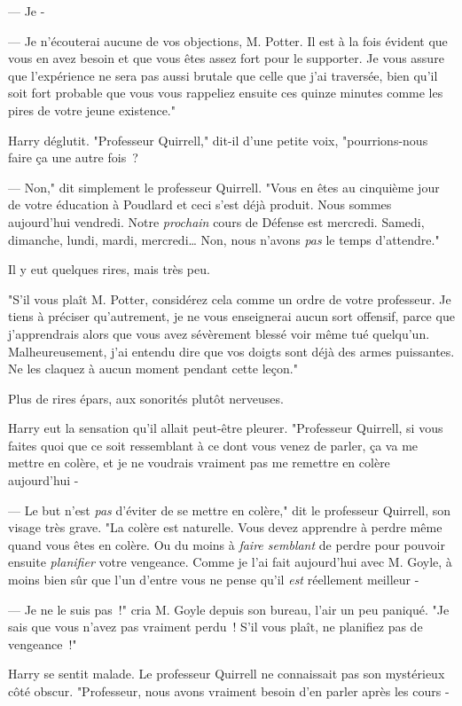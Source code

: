 --- Je -

--- Je n'écouterai aucune de vos objections, M. Potter. Il est à la fois évident que vous en avez besoin et que vous êtes assez fort pour le supporter. Je vous assure que l'expérience ne sera pas aussi brutale que celle que j'ai traversée, bien qu'il soit fort probable que vous vous rappeliez ensuite ces quinze minutes comme les pires de votre jeune existence."

Harry déglutit. "Professeur Quirrell," dit-il d'une petite voix, "pourrions-nous faire ça une autre fois~?

--- Non," dit simplement le professeur Quirrell. "Vous en êtes au cinquième jour de votre éducation à Poudlard et ceci s'est déjà produit. Nous sommes aujourd'hui vendredi. Notre \emph{prochain} cours de Défense est mercredi. Samedi, dimanche, lundi, mardi, mercredi… Non, nous n'avons \emph{pas} le temps d'attendre."

Il y eut quelques rires, mais très peu.

"S'il vous plaît M. Potter, considérez cela comme un ordre de votre professeur. Je tiens à préciser qu'autrement, je ne vous enseignerai aucun sort offensif, parce que j'apprendrais alors que vous avez sévèrement blessé voir même tué quelqu'un. Malheureusement, j'ai entendu dire que vos doigts sont déjà des armes puissantes. Ne les claquez à aucun moment pendant cette leçon."

Plus de rires épars, aux sonorités plutôt nerveuses.

Harry eut la sensation qu'il allait peut-être pleurer. "Professeur Quirrell, si vous faites quoi que ce soit ressemblant à ce dont vous venez de parler, ça va me mettre en colère, et je ne voudrais vraiment pas me remettre en colère aujourd'hui -

--- Le but n'est \emph{pas} d'éviter de se mettre en colère," dit le professeur Quirrell, son visage très grave. "La colère est naturelle. Vous devez apprendre à perdre même quand vous êtes en colère. Ou du moins à \emph{faire semblant} de perdre pour pouvoir ensuite \emph{planifier} votre vengeance. Comme je l'ai fait aujourd'hui avec M. Goyle, à moins bien sûr que l'un d'entre vous ne pense qu'il \emph{est} réellement meilleur -

--- Je ne le suis pas~!" cria M. Goyle depuis son bureau, l'air un peu paniqué. "Je sais que vous n'avez pas vraiment perdu~! S'il vous plaît, ne planifiez pas de vengeance~!"

Harry se sentit malade. Le professeur Quirrell ne connaissait pas son mystérieux côté obscur. "Professeur, nous avons vraiment besoin d'en parler après les cours -

